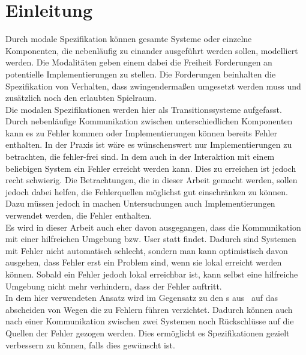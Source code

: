 \chapter{Einleitung}

Durch modale Spezifikation können gesamte Systeme oder einzelne Komponenten,
die nebenläufig zu einander ausgeführt werden sollen, modelliert werden. Die
Modalitäten geben einem dabei die Freiheit Forderungen an potentielle
Implementierungen zu stellen. Die Forderungen beinhalten die Spezifikation von
Verhalten, dass zwingendermaßen umgesetzt werden muss und zusätzlich noch den
erlaubten Spielraum.\\
Die modalen Spezifikationen werden hier als Transitionssysteme aufgefasst.\\
Durch nebenläufige Kommunikation zwischen unterschiedlichen Komponenten kann es
zu Fehler kommen oder Implementierungen können bereits Fehler enthalten. In der
Praxis ist wäre es wünschenswert nur Implementierungen zu betrachten, die
fehler-frei sind. In dem auch in der Interaktion mit einem beliebigen System
ein Fehler erreicht werden kann. Dies zu erreichen ist jedoch recht schwierig.
Die Betrachtungen, die in dieser Arbeit gemacht werden, sollen jedoch dabei
helfen, die Fehlerquellen möglichst gut einschränken zu können. Dazu müssen
jedoch in machen Untersuchungen auch Implementierungen verwendet werden, die
Fehler enthalten.\\
Es wird in dieser Arbeit auch eher davon ausgegangen, dass die Kommunikation
mit einer hilfreichen Umgebung bzw. User statt findet. Dadurch sind Systemen
mit Fehler nicht automatisch schlecht, sondern man kann optimistisch davon
ausgehen, dass Fehler erst ein Problem sind, wenn sie lokal erreicht werden
können. Sobald ein Fehler jedoch lokal erreichbar ist, kann selbst eine
hilfreiche Umgebung nicht mehr verhindern, dass der Fehler auftritt.\\
In dem hier verwendeten Ansatz wird im Gegensatz zu den \MIA{}s
aus~\cite{Vogler2016MIA3} auf das abscheiden von Wegen die zu Fehlern führen
verzichtet. Dadurch können auch nach einer Kommunikation zwischen zwei Systemen
noch Rückschlüsse auf die Quellen der Fehler gezogen werden. Dies ermöglicht es
Spezifikationen gezielt verbessern zu können, falls dies gewünscht ist.

